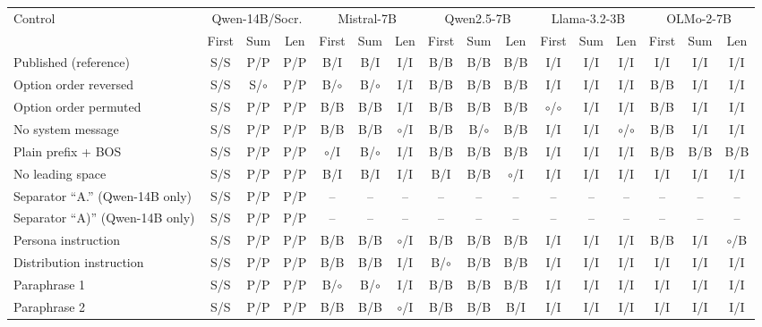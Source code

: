 \begin{table}[t]
\centering\scriptsize
\setlength{\tabcolsep}{2.4pt}
\begin{tabular}{@{}lccccccccccccccc@{}}
\toprule
Control & \multicolumn{3}{c}{Qwen-14B/Socr.} & \multicolumn{3}{c}{Mistral-7B} & \multicolumn{3}{c}{Qwen2.5-7B} & \multicolumn{3}{c}{Llama-3.2-3B} & \multicolumn{3}{c}{OLMo-2-7B} \\
\cmidrule(lr){2-4}\cmidrule(lr){5-7}\cmidrule(lr){8-10}\cmidrule(lr){11-13}\cmidrule(l){14-16}
& First & Sum & Len & First & Sum & Len & First & Sum & Len & First & Sum & Len & First & Sum & Len \\
\midrule
Published (reference) & S/S & P/P & P/P & B/I & B/I & I/I & B/B & B/B & B/B & I/I & I/I & I/I & I/I & I/I & I/I \\
Option order reversed & S/S & S/$\circ$ & P/P & B/$\circ$ & B/$\circ$ & I/I & B/B & B/B & B/B & I/I & I/I & I/I & B/B & I/I & I/I \\
Option order permuted & S/S & P/P & P/P & B/B & B/B & I/I & B/B & B/B & B/B & $\circ$/$\circ$ & I/I & I/I & B/B & I/I & I/I \\
No system message & S/S & P/P & P/P & B/B & B/B & $\circ$/I & B/B & B/$\circ$ & B/B & I/I & I/I & $\circ$/$\circ$ & B/B & I/I & I/I \\
Plain prefix + BOS & S/S & P/P & P/P & $\circ$/I & B/$\circ$ & I/I & B/B & B/B & B/B & I/I & I/I & I/I & B/B & B/B & B/B \\
No leading space & S/S & P/P & P/P & B/I & B/I & I/I & B/I & B/B & $\circ$/I & I/I & I/I & I/I & I/I & I/I & I/I \\
Separator ``A.'' (Qwen-14B only) & S/S & P/P & P/P & -- & -- & -- & -- & -- & -- & -- & -- & -- & -- & -- & -- \\
Separator ``A)'' (Qwen-14B only) & S/S & P/P & P/P & -- & -- & -- & -- & -- & -- & -- & -- & -- & -- & -- & -- \\
Persona instruction & S/S & P/P & P/P & B/B & B/B & $\circ$/I & B/B & B/B & B/B & I/I & I/I & I/I & B/B & I/I & $\circ$/B \\
Distribution instruction & S/S & P/P & P/P & B/B & B/B & I/I & B/$\circ$ & B/B & B/B & I/I & I/I & I/I & I/I & I/I & I/I \\
Paraphrase 1 & S/S & P/P & P/P & B/$\circ$ & B/$\circ$ & I/I & B/B & B/B & B/B & I/I & I/I & I/I & I/I & I/I & I/I \\
Paraphrase 2 & S/S & P/P & P/P & B/B & B/B & $\circ$/I & B/B & B/B & B/I & I/I & I/I & I/I & I/I & I/I & I/I \\

\end{tabular}
\end{table}
